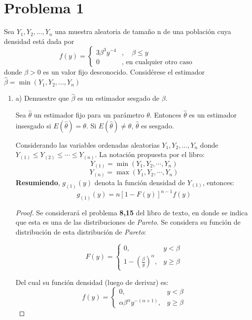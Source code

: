 \section{Problema 1}
Sea $Y_{1}, Y_{2}, \ldots, Y_{n}$ una muestra aleatoria de tamaño $\mathrm{n}$ de una población cuya densidad está dada por
$$
f(y)=\left\{\begin{array}{ll}
3 \beta^{3} y^{-4} & , \quad \beta \leq y \\
0 & , \text { en cualquier otro caso }
\end{array}\right.
$$
donde $\beta>0$ es un valor fijo desconocido. Considérese el estimador $\hat{\beta}=\min \left(Y_{1}, Y_{2}, \ldots, Y_{n}\right)$
\begin{enumerate}
    \item a) Demuestre que $\hat{\beta}$ es un estimador sesgado de $\beta$.
    \begin{tcolorbox}[colback=gray!15,colframe=blue!1!blue,title=Definición 8.2]
    Sea $\hat{\theta}$ un estimador fijo para un parámetro $\theta$. Entonces $\hat{\theta}$ es un estimador insesgado si $E(\hat{\theta})=\theta$. Si $E(\hat{\theta})\neq \theta$, $\hat{\theta}$ es sesgado.
    \end{tcolorbox}
    \begin{tcolorbox}[colback=gray!15,colframe=purple!10!purple,title=Sección 6.7 - Estadísticos de Orden (Order Statistics)]
   Considerando las variables ordenadas aleatorias $Y_1,Y_2,...,Y_n$ donde $Y_{(1)}\leq Y_{(2)}\leq\cdots\leq Y_{(n)}$. La notación propuesta por el libro: 
   $$Y_{(1)}=\min (Y_1,Y_2,\cdots, Y_n)$$
   $$Y_{(n)}=\max (Y_1,Y_2,\cdots, Y_n)$$
   \textbf{Resumiendo}, $g_{(1)}(y)$ denota la función densidad de $Y_{(1)}$, entonces:
   $$g_{(1)}(y)=n\left[1-F(y)\right]^{n-1}f(y)$$
    \end{tcolorbox}
    \begin{proof}
    Se considerará el problema \textbf{8,15} del libro de texto, en donde se indica que esta es una de las distribuciones de \textit{Pareto}. Se considera su función de distribución de esta distribución de \textit{Pareto}: 
    
    $$F(y)=\begin{cases}0,& y<\beta\\
    1-\left(\frac{\beta}{y}\right)^\alpha, & y\geq \beta \end{cases}$$
    
    Del cual su función densidad (luego de derivar) es: 
    $$f(y)=\begin{cases}0,& y<\beta\\
    \alpha \beta ^\alpha y^{-(\alpha +1)}, & y\geq \beta \end{cases}$$
    

\end{proof}
\end{enumerate}
